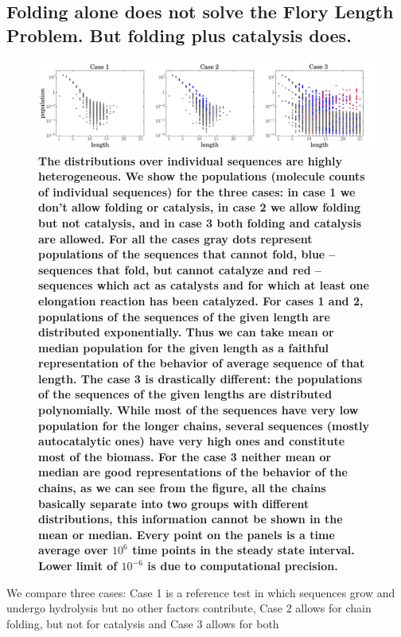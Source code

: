 \documentclass[twocolumn,letterpaper]{revtex4}
\begin{document}
\subsection*{Folding alone does not solve the Flory Length Problem.  But folding plus catalysis 
does.}
\begin{figure}[htb!]
  \centering
  \includegraphics[width=\textwidth]{pictures/scatter-all-three.pdf}
  \caption{\footnotesize{\textbf{\bf{The distributions over individual sequences are highly 
heterogeneous.}  We show the populations (molecule counts of individual 
sequences) for the three cases: in case 1 we don't allow folding or catalysis, in case 2 
we allow folding but not catalysis, and in case 3 both folding and catalysis are allowed. For 
all the cases gray dots represent populations of the sequences that cannot fold, 
blue -- sequences that fold, but cannot 
catalyze and red -- sequences which act as catalysts and for which at least one elongation 
reaction 
has been catalyzed.  For cases 1 and 2, populations of the sequences of the given length are 
distributed exponentially. Thus we can take mean or median population for the given length as a 
faithful representation of the behavior of average sequence of that length. The case 3 is 
drastically different: the populations of the sequences of the given lengths are distributed 
polynomially. While most of the sequences have very low population for the longer chains, 
several sequences (mostly autocatalytic ones) have very high ones and constitute most of the 
biomass. 
For the case 3 neither mean or median are good representations of the behavior of the chains, 
as we can see from the figure, all the chains basically separate into two groups with different 
distributions, this information cannot be shown in the mean or median.  Every 
point on the panels is a time average over $10^6$ time points in the steady state interval. Lower 
limit of $10^{-6}$ is due to computational precision.}}}
  \label{fig:stats-scatter-018}
\end{figure}
 We compare three cases:  Case 1 is a reference test in which sequences grow and undergo 
hydrolysis 
but no other factors 
contribute, Case 2 allows for chain folding, but not for catalysis and Case 3 allows for both 
\end{document}
